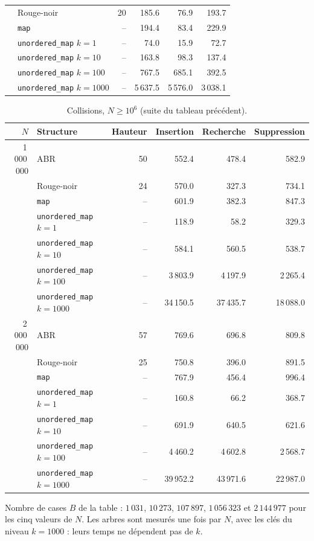 \documentclass[12pt,a4paper]{report}
\newcommand{\bad}{\cellcolor{ko}}
\begin{document}
\begin{table}[H]
\begin{tabular}{rlrrrr}
           & Rouge-noir & 20 & 185.6 & 76.9 & 193.7 \\
           & \texttt{map} & -- & 194.4 & 83.4 & 229.9 \\
           & \texttt{unordered\_map} $k=1$ & -- & 74.0 & 15.9 & 72.7 \\
           & \texttt{unordered\_map} $k=10$ & -- & 163.8 & \bad 98.3 & 137.4 \\
           & \texttt{unordered\_map} $k=100$ & -- & \bad 767.5 & \bad 685.1 & \bad 392.5 \\
           & \texttt{unordered\_map} $k=1000$ & -- & \bad 5\,637.5 & \bad 5\,576.0 & \bad 3\,038.1 \\
  \bottomrule
\end{tabular}
\end{table}

\begin{table}[H]
\centering
\caption{Collisions, $N \ge 10^6$ (suite du tableau précédent).}
\small
\begin{tabular}{rlrrrr}
  \toprule
  $N$ & Structure & Hauteur & Insertion & Recherche & Suppression \\
  \midrule
  1\,000\,000 & ABR & 50 & 552.4 & 478.4 & 582.9 \\
              & Rouge-noir & 24 & 570.0 & 327.3 & 734.1 \\
              & \texttt{map} & -- & 601.9 & 382.3 & 847.3 \\
              & \texttt{unordered\_map} $k=1$ & -- & 118.9 & 58.2 & 329.3 \\
              & \texttt{unordered\_map} $k=10$ & -- & \bad 584.1 & \bad 560.5 & 538.7 \\
              & \texttt{unordered\_map} $k=100$ & -- & \bad 3\,803.9 & \bad 4\,197.9 & \bad 2\,265.4 \\
              & \texttt{unordered\_map} $k=1000$ & -- & \bad 34\,150.5 & \bad 37\,435.7 & \bad 18\,088.0 \\
  \midrule
  2\,000\,000 & ABR & 57 & 769.6 & 696.8 & 809.8 \\
              & Rouge-noir & 25 & 750.8 & 396.0 & 891.5 \\
              & \texttt{map} & -- & 767.9 & 456.4 & 996.4 \\
              & \texttt{unordered\_map} $k=1$ & -- & 160.8 & 66.2 & 368.7 \\
              & \texttt{unordered\_map} $k=10$ & -- & 691.9 & \bad 640.5 & 621.6 \\
              & \texttt{unordered\_map} $k=100$ & -- & \bad 4\,460.2 & \bad 4\,602.8 & \bad 2\,568.7 \\
              & \texttt{unordered\_map} $k=1000$ & -- & \bad 39\,952.2 & \bad 43\,971.6 & \bad 22\,987.0 \\
  \bottomrule
\end{tabular}
\end{table}
Nombre de cases $B$ de la table : $1\,031$, $10\,273$, $107\,897$, $1\,056\,323$ et $2\,144\,977$ pour les cinq valeurs de $N$. Les arbres sont mesurés une fois par $N$, avec les clés du niveau $k = 1000$ : leurs temps ne dépendent pas de $k$.
\end{document}
